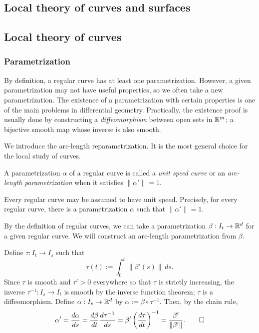 \documentclass{../note}
\def\a{\alpha}
\begin{document}
\begin{prb}
\part{Local theory of curves and surfaces}

\chapter{Local theory of curves}

\section{Parametrization}

By definition, a regular curve has at least one parametrization.
However, a given parametrization may not have useful properties, so we often take a new parametrization.
The existence of a parametrization with certain properties is one of the main problems in differential geometry.
Practically, the existence proof is usually done by constructing a \emph{diffeomorphism} between open sets in $\mathbb{R}^m$; a bijective smooth map whose inverse is also smooth.

We introduce the arc-length reparametrization.
It is the most general choice for the local study of curves.
\begin{defn}
A parametrization $\a$ of a regular curve is called a \emph{unit speed curve} or an \emph{arc-length parametrization} when it satisfies $\|\a'\|=1$.
\end{defn}
\begin{thm}
Every regular curve may be assumed to have unit speed.
Precisely, for every regular curve, there is a parametrization $\a$ such that $\|\a'\|=1$.
\end{thm}
\begin{pf}
By the definition of regular curves, we can take a parametrization $\beta:I_t\to\mathbb{R}^d$ for a given regular curve.
We will construct an arc-length parametrization from $\beta$.

Define $\tau:I_t\to I_s$ such that
\[\tau(t):=\int_0^t\|\beta'(s)\|\,ds.\]
Since $\tau$ is smooth and $\tau'>0$ everywhere so that $\tau$ is strictly increasing, the inverse $\tau^{-1}:I_s\to I_t$ is smooth by the inverse function theorem; $\tau$ is a diffeomorphism.
Define $\a:I_s\to\R^d$ by $\a:=\beta\circ\tau^{-1}$.
Then, by the chain rule,
\[\a'=\dd{\a}{s}=\dd{\beta}{t}\dd{\tau^{-1}}{s}=\beta'\left(\dd{\tau}{t}\right)^{-1}=\frac{\beta'}{\|\beta'\|}.\qedhere\]
\end{pf}





\end{prb}
\end{document}
